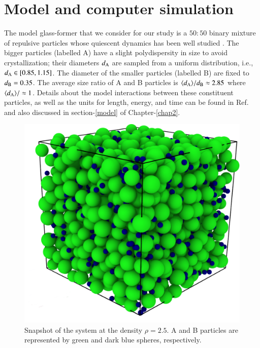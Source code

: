 %
\section{Model and computer simulation}
%
The model glass-former that we consider for our study is a $50:50$ binary mixture of repulsive particles whose quiescent dynamics has been well studied \cite{juergen2009}. The bigger particles (labelled A) have a slight polydispersity in size to avoid crystallization; their diameters $d_{\rm A}$ are sampled from a uniform distribution, i.e., $d_{\rm A} \in [0.85,1.15]$. The diameter of the smaller particles (labelled B) are fixed to $d_{\rm B} = 0.35$. The average size ratio of A and B particles is $\langle d_{\rm A} \rangle/d_{\rm B} \approx 2.85$ where $\langle d_{\rm A} \rangle/ \approx 1$. Details about the model interactions between these constituent particles, as well as the units for length, energy, and time  can be found in Ref.~\cite{juergen2009} and also discussed in section-\ref{model} of Chapter-\ref{chap2}. 

\begin{figure}
\centering
\includegraphics[width=12cm]{figs/fig6p1.pdf}
\caption[{\em Snapshot of the system at the density $\rho = 2.5$}]{Snapshot of the system at the density $\rho = 2.5$. A and
B particles are represented by green and dark blue spheres, respectively.
\label{fig6p1}}
\end{figure}

